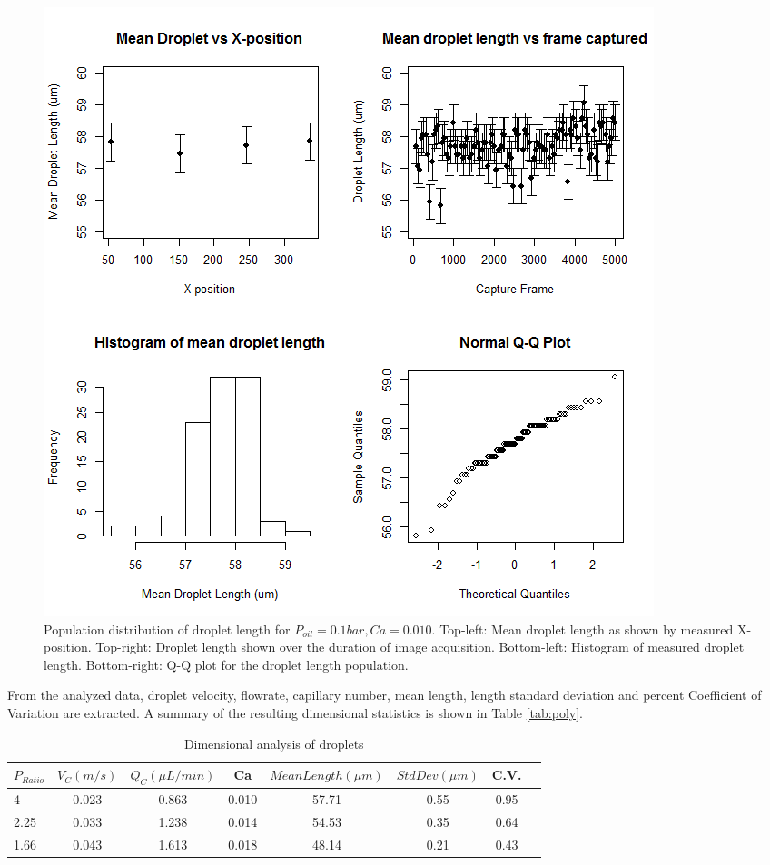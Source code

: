 \begin{figure}[H]
\centering 
\includegraphics[width=01.0\columnwidth]{1_poly.PNG} 
\caption[Polydispersity]{Population distribution of droplet length for $P_{oil} = 0.1 bar, Ca = 0.010$. Top-left: Mean droplet length as shown by measured X-position. Top-right: Droplet length shown over the duration of image acquisition. Bottom-left: Histogram of measured droplet length. Bottom-right: Q-Q plot for the droplet length population.} 
\label{fig:1_poly} 
\end{figure}

\clearpage

From the analyzed data, droplet velocity, flowrate, capillary number, mean length, length standard deviation and percent Coefficient of Variation are extracted. A summary of the resulting dimensional statistics is shown in Table \vref{tab:poly}.

\qquad

\begin{table}[H]
\begin{tabular}{l*{6}{c}r}
$ P_{Ratio} $ & $ V_C  (m/s) $ &  $ Q_C ( \mu  L/min) $ & Ca & $ Mean Length( \mu m )$ & $ StdDev( \mu m) $ & C.V. \\
\hline
4 & 0.023 & 0.863 & 0.010 & 57.71 & 0.55 & 0.95 \\
2.25 & 0.033 & 1.238 & 0.014 & 54.53 & 0.35 &  0.64 \\
1.66 & 0.043 & 1.613 & 0.018 & 48.14 & 0.21 &  0.43 \\
\end{tabular}
\caption[Droplet Polydispersity]{Dimensional analysis of droplets}
\label{tab:poly} 
\end{table}


